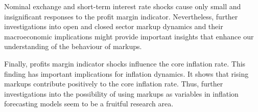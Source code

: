 \documentclass[twoside]{article}
\begin{document}
\begin{multicols}{2}
Nominal exchange and short-term interest rate shocks cause only small and insignificant responses to the profit margin indicator. Nevertheless, further investigations into open and closed sector markup dynamics and their macroeconomic implications might provide important insights that enhance our understanding of the behaviour of markups. 

Finally, profits margin indicator shocks influence the core inflation rate. This finding has important implications for inflation dynamics. It shows that rising markups contribute positively to the core inflation rate. Thus, further investigations into the possibility of using markups as variables in inflation forecasting models seem to be a fruitful research area.    

  
\clearpage

\renewcommand*{\bibfont}{\scriptsize}
\printbibliography




\clearpage





\end{multicols}
\end{document}
